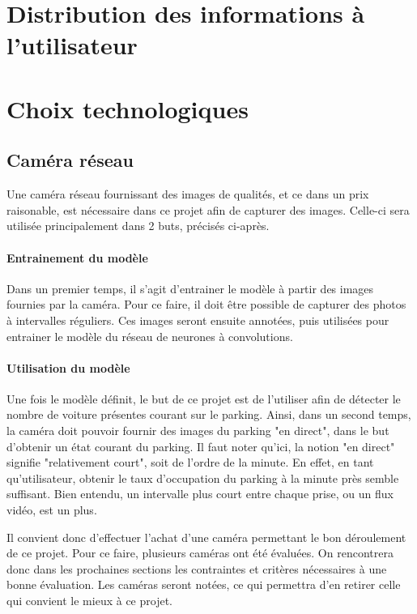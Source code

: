 \section{Distribution des informations à l'utilisateur}


\section{Choix technologiques}

\subsection{Caméra réseau}\label{conception.techno.camera}
Une caméra réseau fournissant des images de qualités, et ce dans un prix raisonable, est nécessaire dans ce projet afin de capturer des images. Celle-ci sera utilisée principalement dans 2 buts, précisés ci-après.

\paragraph{Entrainement du modèle}
Dans un premier temps, il s'agit d'entrainer le modèle à partir des images fournies par la caméra. Pour ce faire, il doit être possible de capturer des photos à intervalles réguliers. Ces images seront ensuite annotées, puis utilisées pour entrainer le modèle du réseau de neurones à convolutions. 

\paragraph{Utilisation du modèle}
Une fois le modèle définit, le but de ce projet est de l'utiliser afin de détecter le nombre de voiture présentes courant sur le parking. Ainsi, dans un second temps, la caméra doit pouvoir fournir des images du parking "en direct", dans le but d'obtenir un état courant du parking. Il faut noter qu'ici, la notion "en direct" signifie "relativement court", soit de l'ordre de la minute. En effet, en tant qu'utilisateur, obtenir le taux d'occupation du parking à la minute près semble suffisant. Bien entendu, un intervalle plus court entre chaque prise, ou un flux vidéo, est un plus.

Il convient donc d'effectuer l'achat d'une caméra permettant le bon déroulement de ce projet. Pour ce faire, plusieurs caméras ont été évaluées. On rencontrera donc dans les prochaines sections les contraintes et critères nécessaires à une bonne évaluation. Les caméras seront notées, ce qui permettra d'en retirer celle qui convient le mieux à ce projet.

